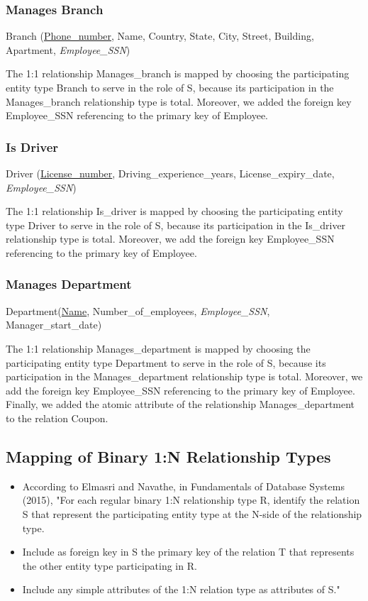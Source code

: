 \documentclass[11pt]{article}
\begin{document}
\subsubsection{Manages Branch}

Branch (\underline{Phone\_number}, Name, Country, State, City, Street, Building, Apartment, \textit{Employee\_SSN})

The 1:1 relationship Manages\_branch is mapped by choosing the participating entity type Branch to serve in the role of S, because its participation in the Manages\_branch relationship type is total. Moreover, we added the foreign key Employee\_SSN referencing to the primary key of Employee.

\subsubsection{Is Driver}

Driver (\underline{License\_number}, Driving\_experience\_years, License\_expiry\_date, \textit{Employee\_SSN})

The 1:1 relationship Is\_driver is mapped by choosing the participating entity type Driver to serve in the role of S, because its participation in the Is\_driver relationship type is total. Moreover, we add the foreign key Employee\_SSN referencing to the primary key of Employee.

\subsubsection{Manages Department}

Department(\underline{Name}, Number\_of\_employees, \textit{Employee\_SSN}, Manager\_start\_date)

The 1:1 relationship Manages\_department is mapped by choosing the participating entity type Department to serve in the role of S, because its participation in the Manages\_department relationship type is total. Moreover, we add the foreign key Employee\_SSN referencing to the primary key of Employee. Finally, we added the atomic attribute of the relationship Manages\_department to the relation Coupon.

\subsection{Mapping of Binary 1:N Relationship Types}

\begin{itemize}
  \item According to Elmasri and Navathe, in Fundamentals of Database Systems (2015), "For each regular binary 1:N relationship type R, identify the relation S that represent the participating entity type at the N-side of the relationship type.
  \item Include as foreign key in S the primary key of the relation T that represents the other entity type participating in R.
  \item Include any simple attributes of the 1:N relation type as attributes of S." \cite{elmasri}
\end{itemize}
\end{document}
